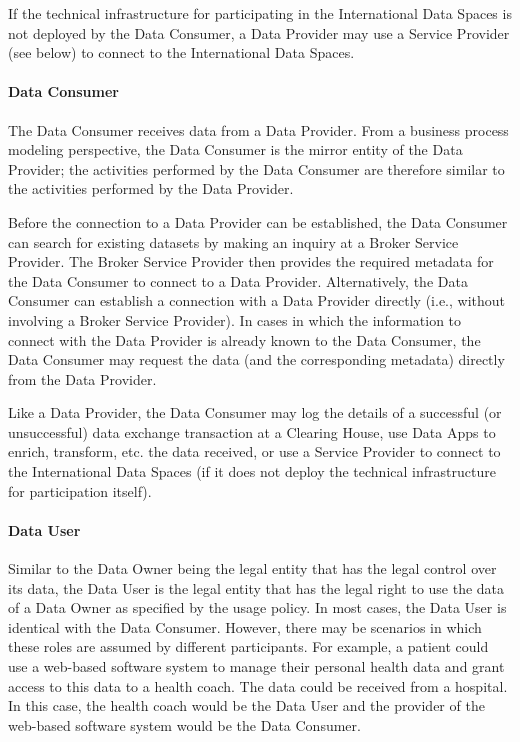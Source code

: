If the technical infrastructure for participating in the International Data Spaces is not deployed by the Data Consumer, a Data Provider may use a Service Provider (see below) to connect to the International Data Spaces.

\paragraph{Data Consumer}
The Data Consumer receives data from a Data Provider. From a business process modeling perspective, the Data Consumer is the mirror entity of the Data Provider; the activities performed by the Data Consumer are therefore similar to the activities performed by the Data Provider.

Before the connection to a Data Provider can be established, the Data Consumer can search for existing datasets by making an inquiry at a Broker Service Provider. The Broker Service Provider then provides the required metadata for the Data Consumer to connect to a Data Provider. Alternatively, the Data Consumer can establish a connection with a Data Provider directly (i.e., without involving a Broker Service Provider). In cases in which the information to connect with the Data Provider is already known to the Data Consumer, the Data Consumer may request the data (and the corresponding metadata) directly from the Data Provider.

Like a Data Provider, the Data Consumer may log the details of a successful (or unsuccessful) data exchange transaction at a Clearing House, use Data Apps to enrich, transform, etc. the data received, or use a Service Provider to connect to the International Data Spaces (if it does not deploy the technical infrastructure for participation itself).

\paragraph{Data User}
Similar to the Data Owner being the legal entity that has the legal control over its data, the Data User is the legal entity that has the legal right to use the data of a Data Owner as specified by the usage policy. In most cases, the Data User is identical with the Data Consumer. However, there may be scenarios in which these roles are assumed by different participants. For example, a patient could use a web-based software system to manage their personal health data and grant access to this data to a health coach. The data could be received from a hospital. In this case, the health coach would be the Data User and the provider of the web-based software system would be the Data Consumer.

